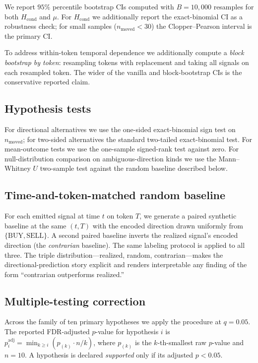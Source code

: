 \documentclass[review,12pt,authoryear]{elsarticle}
\begin{document}
We report \(95\%\) percentile bootstrap \citep{EfronTibshirani1993} CIs
computed with \(B = 10{,}000\) resamples for both \(H_\text{cond}\) and
\(\mu\). For \(H_\text{cond}\) we additionally report the exact-binomial
\citet{ClopperPearson1934} CI as a robustness check; for small samples
(\(n_\text{moved} < 30\)) the Clopper--Pearson interval is the primary CI.

To address within-token temporal dependence we additionally compute a
\emph{block bootstrap by token}: resampling tokens with replacement and
taking all signals on each resampled token. The wider of the vanilla and
block-bootstrap CIs is the conservative reported claim.

\subsection{Hypothesis tests}

For directional alternatives we use the one-sided exact-binomial sign test
on \(n_\text{moved}\); for two-sided alternatives the standard two-tailed
exact-binomial test. For mean-outcome tests we use the one-sample
\citet{Wilcoxon1945} signed-rank test against zero. For null-distribution comparison on
ambiguous-direction kinds we use the Mann--Whitney \(U\) two-sample test
against the random baseline described below.

\subsection{Time-and-token-matched random baseline}

For each emitted signal at time \(t\) on token \(T\), we generate a paired
synthetic baseline at the same \((t, T)\) with the encoded direction drawn
uniformly from \(\{\text{BUY}, \text{SELL}\}\). A second paired baseline
inverts the realized signal's encoded direction (the \emph{contrarian}
baseline). The same labeling protocol is applied to all three. The triple
distribution---realized, random, contrarian---makes the directional-prediction
story explicit and renders interpretable any finding of the form
``contrarian outperforms realized.''

\subsection{Multiple-testing correction}

Across the family of ten primary hypotheses we apply the
\citet{BenjaminiHochberg1995} procedure at \(q = 0.05\). The reported
FDR-adjusted \(p\)-value for hypothesis \(i\) is
\(p^{\text{adj}}_i = \min_{k \geq i} \left( p_{(k)} \cdot n / k \right)\),
where \(p_{(k)}\) is the \(k\)-th-smallest raw \(p\)-value and \(n = 10\).
A hypothesis is declared \emph{supported} only if its adjusted \(p < 0.05\).
\end{document}
